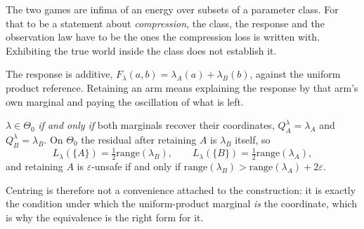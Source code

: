 The two games are infima of an energy over subsets of a parameter class. For that to be a
statement about \emph{compression}, the class, the response and the observation law have to
be the ones the compression loss is written with. Exhibiting the true world inside the class
does not establish it.

The response is additive, $F_{\lambda}(a,b)=\lambda_{A}(a)+\lambda_{B}(b)$, against the
uniform product reference. Retaining an arm means explaining the response by that arm's own
marginal and paying the oscillation of what is left.

\begin{theorem}
\label{thm:modelbridge}
$\lambda\in\Theta_{0}$ \emph{if and only if} both marginals recover their coordinates,
$Q^{\lambda}_{A}=\lambda_{A}$ and $Q^{\lambda}_{B}=\lambda_{B}$. On $\Theta_{0}$ the
residual after retaining $A$ is $\lambda_{B}$ itself, so
\[
L_{\lambda}(\{A\})=\tfrac12\mathrm{range}(\lambda_{B}),
\qquad
L_{\lambda}(\{B\})=\tfrac12\mathrm{range}(\lambda_{A}),
\]
and retaining $A$ is $\varepsilon$-unsafe if and only if
$\mathrm{range}(\lambda_{B})>\mathrm{range}(\lambda_{A})+2\varepsilon$.
\end{theorem}

Centring is therefore not a convenience attached to the construction: it is exactly the
condition under which the uniform-product marginal \emph{is} the coordinate, which is why
the equivalence is the right form for it.



